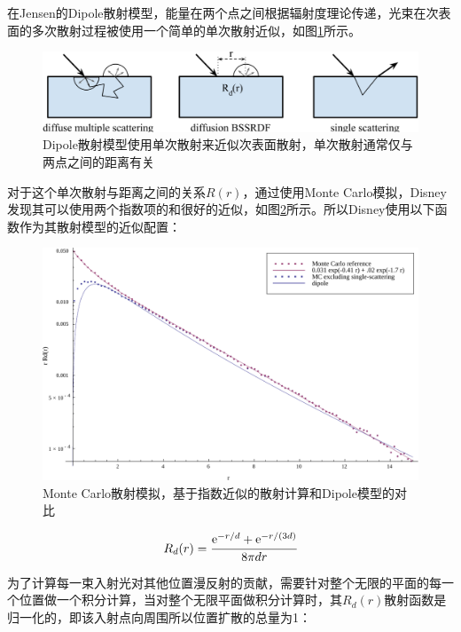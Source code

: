 在Jensen的Dipole散射模型，能量在两个点之间根据辐射度理论传递，光束在次表面的多次散射过程被使用一个简单的单次散射近似，如图\ref{f:intro-bssrdf}所示。

\begin{figure}
	\includegraphics[width=\textwidth]{figures/intro/bssrdf}
	\caption{Dipole散射模型使用单次散射来近似次表面散射，单次散射通常仅与两点之间的距离有关}
	\label{f:intro-bssrdf}
\end{figure}

对于这个单次散射与距离之间的关系$R(r)$，通过使用Monte Carlo模拟，Disney发现其可以使用两个指数项的和很好的近似，如图\ref{f:intro-bssrdf-r}所示。所以Disney使用以下函数作为其散射模型的近似配置：

\begin{figure}
\begin{fullwidth}
	\includegraphics[width=\thewidth]{figures/intro/monteCarloFit}
	\caption{Monte Carlo散射模拟，基于指数近似的散射计算和Dipole模型的对比}
	\label{f:intro-bssrdf-r}
\end{fullwidth}
\end{figure}

\begin{equation}
	R_d(r)= \cfrac{{\rm e}^{-r/d}+{\rm e}^{-r/(3d)}}{8\pi dr}
\end{equation}

\noindent 为了计算每一束入射光对其他位置漫反射的贡献，需要针对整个无限的平面的每一个位置做一个积分计算，当对整个无限平面做积分计算时，其$R_d(r)$散射函数是归一化的，即该入射点向周围所以位置扩散的总量为1：

